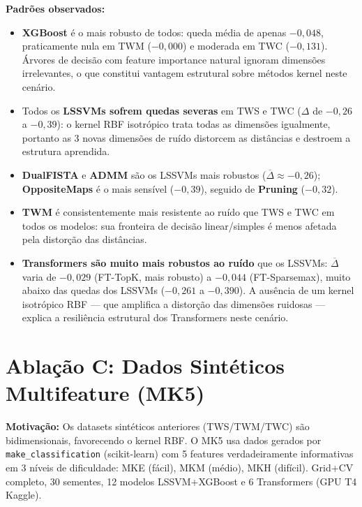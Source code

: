 \documentclass[12pt,a4paper]{article}
\begin{document}
\textbf{Padrões observados:}
\begin{itemize}
  \item \textbf{XGBoost} é o mais robusto de todos: queda média de apenas
        $-0{,}048$, praticamente nula em TWM ($-0{,}000$) e moderada em TWC
        ($-0{,}131$). Árvores de decisão com feature importance natural ignoram
        dimensões irrelevantes, o que constitui vantagem estrutural sobre
        métodos kernel neste cenário.
  \item Todos os \textbf{LSSVMs sofrem quedas severas} em TWS e TWC
        ($\Delta$ de $-0{,}26$ a $-0{,}39$): o kernel RBF isotrópico trata
        todas as dimensões igualmente, portanto as 3 novas dimensões de ruído
        distorcem as distâncias e destroem a estrutura aprendida.
  \item \textbf{DualFISTA} e \textbf{ADMM} são os LSSVMs mais robustos
        ($\overline{\Delta} \approx -0{,}26$); \textbf{OppositeMaps} é o mais
        sensível ($-0{,}39$), seguido de \textbf{Pruning} ($-0{,}32$).
  \item \textbf{TWM} é consistentemente mais resistente ao ruído que TWS e TWC
        em todos os modelos: sua fronteira de decisão linear/simples é menos
        afetada pela distorção das distâncias.
  \item \textbf{Transformers são muito mais robustos ao ruído} que os LSSVMs:
        $\overline{\Delta}$ varia de $-0{,}029$ (FT-TopK, mais robusto) a
        $-0{,}044$ (FT-Sparsemax), muito abaixo das quedas dos LSSVMs
        ($-0{,}261$ a $-0{,}390$). A ausência de um kernel isotrópico RBF ---
        que amplifica a distorção das dimensões ruidosas --- explica a
        resiliência estrutural dos Transformers neste cenário.
\end{itemize}

\section{Ablação C: Dados Sintéticos Multifeature (MK5)}
\label{sec:mk5}

\textbf{Motivação:} Os datasets sintéticos anteriores (TWS/TWM/TWC) são
bidimensionais, favorecendo o kernel RBF. O MK5 usa dados gerados por
\texttt{make\_classification} (scikit-learn) com 5 features verdadeiramente
informativas em 3 níveis de dificuldade: MKE (fácil), MKM (médio), MKH (difícil).
Grid+CV completo, 30 sementes, 12 modelos LSSVM+XGBoost e 6 Transformers
(GPU T4 Kaggle).
\end{document}
